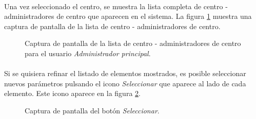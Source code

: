   \paragraph{}Una vez seleccionado el centro, se muestra la lista completa de
  centro - administradores de centro que aparecen en el sistema. La figura
  \ref{capturaPantallaListaCentroAdministradoresCentroAdminPrincipal} muestra
  una captura de pantalla de la lista de centro - administradores de centro.

  \begin{figure}[!ht]
    \begin{center}
      \caption{Captura de pantalla de la lista de centro - administradores de centro para el usuario \textit{Administrador principal}.}
      \label{capturaPantallaListaCentroAdministradoresCentroAdminPrincipal}
    \end{center}
  \end{figure}

  \paragraph{}Si se quisiera refinar el listado de elementos mostrados, es
  posible seleccionar nuevos parámetros pulsando el icono \textit{Seleccionar}
  que aparece al lado de cada elemento. Este icono aparece en la figura
  \ref{capturaBotonSeleccionar}.

  \begin{figure}[!ht]
    \begin{center}
      \caption{Captura de pantalla del botón \textit{Seleccionar}.}
      \label{capturaBotonSeleccionar}
    \end{center}
  \end{figure}
